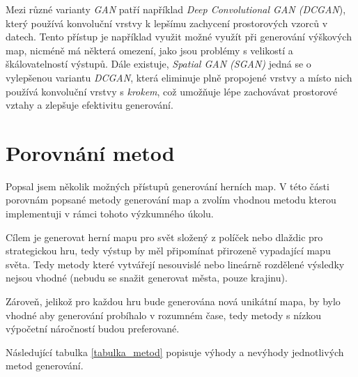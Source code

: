 Mezi různé varianty \textit{GAN} patří například \textit{Deep Convolutional GAN (DCGAN}), který používá konvoluční vrstvy k lepšímu zachycení prostorových vzorců v datech. Tento přístup je například využit možné využít při generování výškových map, nicméně má některá omezení, jako jsou problémy s velikostí a škálovatelností výstupů. Dále existuje, \textit{Spatial GAN (SGAN)} jedná se o vylepšenou variantu \textit{DCGAN}, která eliminuje plně propojené vrstvy a místo nich používá konvoluční vrstvy s \textit{krokem}, což umožňuje lépe zachovávat prostorové vztahy a zlepšuje efektivitu generování. \cite{GANclanek}



\section{Porovnání metod}

Popsal jsem několik možných přístupů generování herních map. V této části porovnám popsané metody generování map a zvolím vhodnou metodu kterou implementuji v rámci tohoto výzkumného úkolu. 

Cílem je generovat herní mapu pro svět složený z políček nebo dlaždic pro strategickou hru, tedy výstup by měl připomínat přirozeně vypadající mapu světa. Tedy metody které vytvářejí nesouvislé nebo lineárně rozdělené výsledky nejsou vhodné (nebudu se snažit generovat města, pouze krajinu). 

Zároveň, jelikož pro každou hru bude generována nová unikátní mapa, by bylo vhodné aby generování probíhalo v rozumném čase, tedy metody s nízkou výpočetní náročností budou preferované.

Následující tabulka \ref{tabulka_metod} popisuje výhody a nevýhody jednotlivých metod generování.



